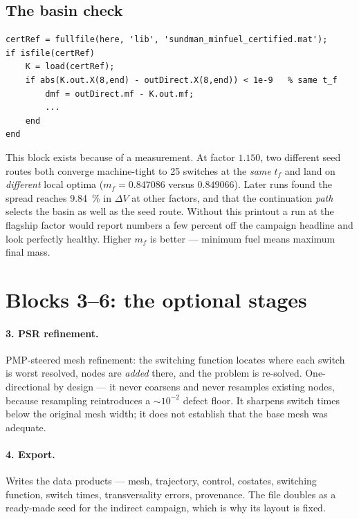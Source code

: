 \documentclass[11pt]{article}
\begin{document}
\subsection{The basin check}

\begin{lstlisting}
certRef = fullfile(here, 'lib', 'sundman_minfuel_certified.mat');
if isfile(certRef)
    K = load(certRef);
    if abs(K.out.X(8,end) - outDirect.X(8,end)) < 1e-9   % same t_f
        dmf = outDirect.mf - K.out.mf;
        ...
    end
end
\end{lstlisting}

This block exists because of a measurement. At factor $1.150$, two different
seed routes both converge machine-tight to 25 switches at the \emph{same} $t_f$
and land on \emph{different} local optima ($m_f = 0.847086$ versus $0.849066$).
Later runs found the spread reaches \SI{9.84}{\percent} in $\Delta V$ at other
factors, and that the continuation \emph{path} selects the basin as well as the
seed route. Without this printout a run at the flagship factor would report
numbers a few percent off the campaign headline and look perfectly healthy.
Higher $m_f$ is better --- minimum fuel means maximum final mass.

\section{Blocks 3--6: the optional stages}

\paragraph{3. PSR refinement.} PMP-steered mesh refinement: the switching
function locates where each switch is worst resolved, nodes are \emph{added}
there, and the problem is re-solved. One-directional by design --- it never
coarsens and never resamples existing nodes, because resampling reintroduces a
${\sim}10^{-2}$ defect floor. It sharpens switch times below the original mesh
width; it does not establish that the base mesh was adequate.

\paragraph{4. Export.} Writes the data products --- mesh, trajectory, control,
costates, switching function, switch times, transversality errors, provenance.
The file doubles as a ready-made seed for the indirect campaign, which is why
its layout is fixed.
\end{document}
